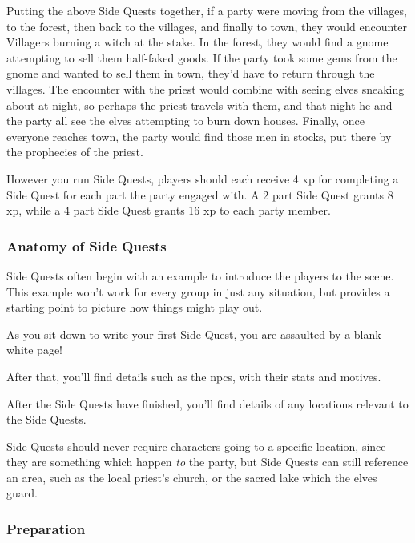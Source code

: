 \begin{multicols}{2}
Putting the above Side Quests together, if a party were moving from the villages, to the forest, then back to the villages, and finally to town, they would 
encounter Villagers burning a witch at the stake.
In the forest, they would find a gnome attempting to sell them half-faked goods.
If the party took some gems from the gnome and wanted to sell them in town, they'd have to return through the villages.
The encounter with the priest would combine with seeing elves sneaking about at night, so perhaps the priest travels with them, and that night he and the party all see the elves attempting to burn down houses.
Finally, once everyone reaches town, the party would find those men in stocks, put there by the prophecies of the priest.

However you run Side Quests, players should each receive 4 \gls{xp} for completing a Side Quest for each part the party engaged with.
A 2 part Side Quest grants 8 \gls{xp}, while a 4 part Side Quest grants 16 \gls{xp} to each party member.

\subsubsection{Anatomy of Side Quests}

Side Quests often begin with an example to introduce the players to the scene.
This example won't work for every group in just any situation, but provides a starting point to picture how things might play out.

\begin{boxtext}

  As you sit down to write your first Side Quest, you are assaulted by a blank white page!

\end{boxtext}

After that, you'll find details such as the \glspl{npc}, with their stats and motives.

After the Side Quests have finished, you'll find details of any locations relevant to the Side Quests.

Side Quests should never require characters going to a specific location, since they are something which happen \emph{to} the party, but Side Quests can still reference an area, such as the local priest's church, or the sacred lake which the elves guard.

\subsubsection{Preparation}


\end{multicols}
